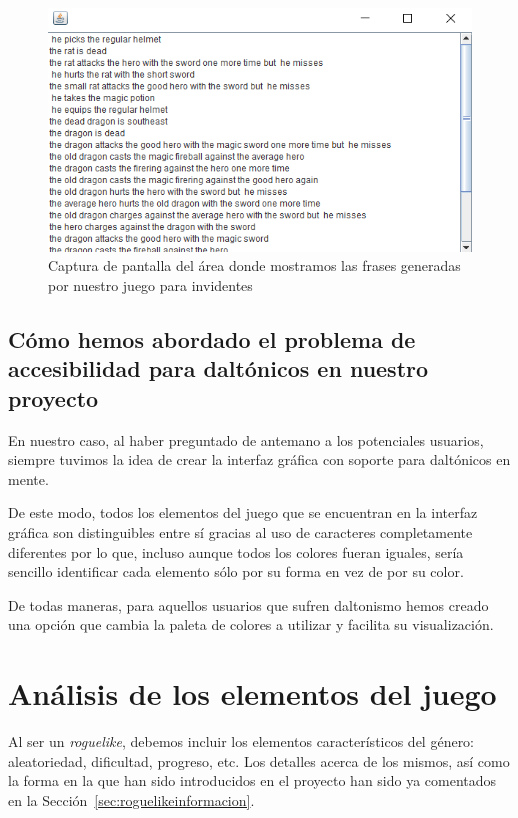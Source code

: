 \begin{figure}[H]
		\includegraphics[width=\textwidth,height=\textheight,keepaspectratio]{./img/roomsGameTextArea.png}
	\caption{Captura de pantalla del área donde mostramos las frases generadas por nuestro juego para invidentes}
	\label{fig:roomsgametextarea}
\end{figure}

\subsection{Cómo hemos abordado el problema de accesibilidad para daltónicos en nuestro proyecto}
\label{sec:solventadodaltonicos}

En nuestro caso, al haber preguntado de antemano a los potenciales usuarios, siempre tuvimos la idea de crear la interfaz gráfica con soporte para daltónicos en mente.

De este modo, todos los elementos del juego que se encuentran en la interfaz gráfica son distinguibles entre sí gracias al uso de caracteres completamente diferentes por lo que, incluso aunque todos los colores fueran iguales, sería sencillo identificar cada elemento sólo por su forma en vez de por su color. 

De todas maneras, para aquellos usuarios que sufren daltonismo hemos creado una opción que cambia la paleta de colores a utilizar y facilita su visualización.

\section{Análisis de los elementos del juego}
Al ser un \textit{roguelike}, debemos incluir los elementos característicos del género: aleatoriedad, dificultad, progreso, etc. Los detalles acerca de los mismos, así como la forma en la que han sido introducidos en el proyecto han sido ya comentados en la Sección~\ref{sec:roguelikeinformacion}.

